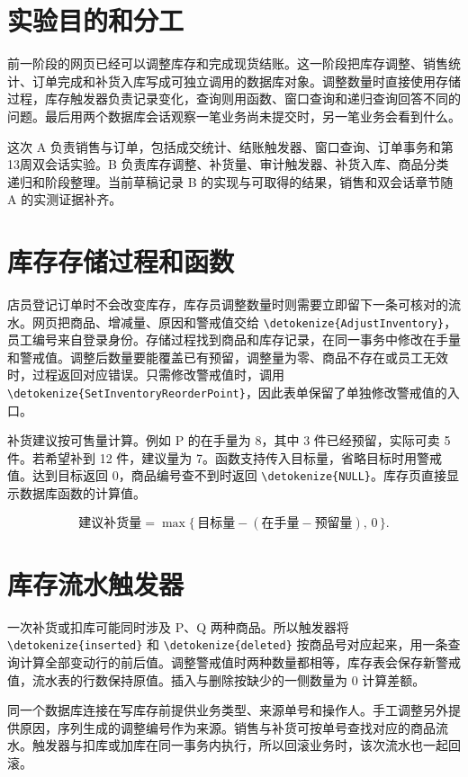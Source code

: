 \documentclass{SYSUReport}
\date{2026年11月26日}
\newcommand{\code}[1]{\expandafter\nolinkurl\expandafter{\detokenize{#1}}}
\begin{document}
\hypersetup{pageanchor=false}
\cover\thispagestyle{empty}\clearpage
{}\hypersetup{pageanchor=true}

\section{实验目的和分工}

前一阶段的网页已经可以调整库存和完成现货结账。这一阶段把库存调整、销售统计、订单完成和补货入库写成可独立调用的数据库对象。调整数量时直接使用存储过程，库存触发器负责记录变化，查询则用函数、窗口查询和递归查询回答不同的问题。最后用两个数据库会话观察一笔业务尚未提交时，另一笔业务会看到什么。

这次 A 负责销售与订单，包括成交统计、结账触发器、窗口查询、订单事务和第13周双会话实验。B 负责库存调整、补货量、审计触发器、补货入库、商品分类递归和阶段整理。当前草稿记录 B 的实现与可取得的结果，销售和双会话章节随 A 的实测证据补齐。

\section{库存存储过程和函数}

店员登记订单时不会改变库存，库存员调整数量时则需要立即留下一条可核对的流水。网页把商品、增减量、原因和警戒值交给 \code{AdjustInventory}，员工编号来自登录身份。存储过程找到商品和库存记录，在同一事务中修改在手量和警戒值。调整后数量要能覆盖已有预留，调整量为零、商品不存在或员工无效时，过程返回对应错误。只需修改警戒值时，调用 \code{SetInventoryReorderPoint}，因此表单保留了单独修改警戒值的入口。

补货建议按可售量计算。例如 P 的在手量为 8，其中 3 件已经预留，实际可卖 5 件。若希望补到 12 件，建议量为 7。函数支持传入目标量，省略目标时用警戒值。达到目标返回 0，商品编号查不到时返回 \code{NULL}。库存页直接显示数据库函数的计算值。

\[
  \text{建议补货量}=\max\{\,\text{目标量}-(\text{在手量}-\text{预留量}),\,0\,\}.
\]

\section{库存流水触发器}

一次补货或扣库可能同时涉及 P、Q 两种商品。所以触发器将 \code{inserted} 和 \code{deleted} 按商品号对应起来，用一条查询计算全部变动行的前后值。调整警戒值时两种数量都相等，库存表会保存新警戒值，流水表的行数保持原值。插入与删除按缺少的一侧数量为 0 计算差额。

同一个数据库连接在写库存前提供业务类型、来源单号和操作人。手工调整另外提供原因，序列生成的调整编号作为来源。销售与补货可按单号查找对应的商品流水。触发器与扣库或加库在同一事务内执行，所以回滚业务时，该次流水也一起回滚。
\end{document}
